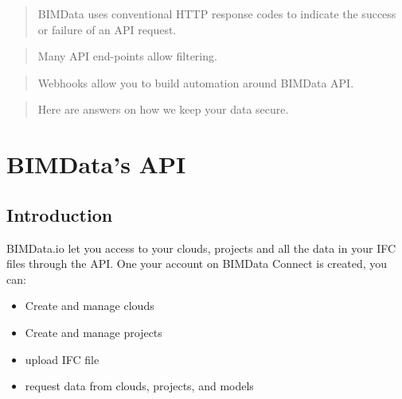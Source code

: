 \documentclass[a4paper,12pt,english]{sphinxmanual}
\begin{document}
\begin{sphinxShadowBox}
\begin{quote}

BIMData uses conventional HTTP response codes to indicate the success or failure of an API request.
\end{quote}
\end{sphinxShadowBox}

\begin{sphinxShadowBox}
\begin{quote}

Many API end-points allow filtering.
\end{quote}
\end{sphinxShadowBox}

\begin{sphinxShadowBox}
\begin{quote}

Webhooks allow you to build automation around BIMData API.
\end{quote}
\end{sphinxShadowBox}

\begin{sphinxShadowBox}
\begin{quote}

Here are answers on how we keep your data secure.
\end{quote}
\end{sphinxShadowBox}


\section{BIMData’s API}
\label{\detokenize{api/introduction:bimdata-s-api}}\label{\detokenize{api/introduction::doc}}

\subsection{Introduction}
\label{\detokenize{api/introduction:introduction}}
BIMData.io let you access to your clouds, projects and all the data in your IFC files through the API.
One your account on BIMData Connect is created, you can:
\begin{itemize}
\item {} 
Create and manage clouds

\item {} 
Create and manage projects

\item {} 
upload IFC file

\item {} 
request data from clouds, projects, and models

\end{itemize}
\end{document}
